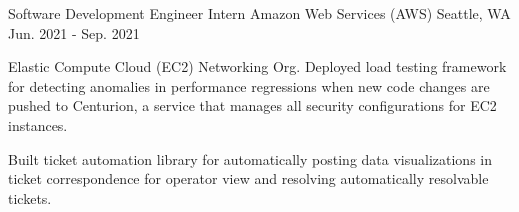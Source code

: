 \cventry
    {Software Development Engineer Intern} %
    {Amazon Web Services (AWS)} %
    {Seattle, WA} %
    {Jun. 2021 - Sep. 2021} %
    {
      \begin{cvitems} %
        \item {Elastic Compute Cloud (EC2) Networking Org. Deployed load testing 
        framework for detecting anomalies in performance regressions when 
        new code changes are pushed to Centurion, a service that manages 
        all security configurations for EC2 instances.}
        \item {Built ticket automation library for automatically 
        posting data visualizations in ticket correspondence for operator view 
        and resolving automatically resolvable tickets.}
      \end{cvitems}
    } 